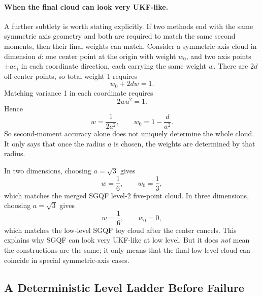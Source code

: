 \documentclass[11pt]{article}
\numberwithin{equation}{section}
\begin{document}
\paragraph{When the final cloud can look very UKF-like.}
A further subtlety is worth stating explicitly.  If two methods end with the same
symmetric axis geometry and both are required to match the same second moments,
then their final weights can match.  Consider a symmetric axis cloud in dimension
\(d\): one center point at the origin with weight \(w_0\), and two axis points
\(\pm a e_i\) in each coordinate direction, each carrying the same weight
\(w\).  There are \(2d\) off-center points, so total weight 1 requires
\begin{equation}
  w_0 + 2dw = 1.
  \label{eq:p42-axis-cloud-total-weight}
\end{equation}
Matching variance 1 in each coordinate requires
\begin{equation}
  2wa^2 = 1.
  \label{eq:p42-axis-cloud-second-moment}
\end{equation}
Hence
\begin{equation}
  w = \frac{1}{2a^2},
  \qquad
  w_0 = 1-\frac{d}{a^2}.
  \label{eq:p42-axis-cloud-weights-solved}
\end{equation}
So second-moment accuracy alone does not uniquely determine the whole cloud.  It
only says that once the radius \(a\) is chosen, the weights are determined by
that radius.

In two dimensions, choosing \(a=\sqrt3\) gives
\begin{equation}
  w = \frac16,
  \qquad
  w_0 = \frac13,
  \label{eq:p42-axis-cloud-2d-weights}
\end{equation}
which matches the merged SGQF level-2 five-point cloud.  In three dimensions,
choosing \(a=\sqrt3\) gives
\begin{equation}
  w = \frac16,
  \qquad
  w_0 = 0,
  \label{eq:p42-axis-cloud-3d-weights}
\end{equation}
which matches the low-level SGQF toy cloud after the center cancels.  This
explains why SGQF can look very UKF-like at low level.  But it does \emph{not}
mean the constructions are the same; it only means that the final low-level cloud
can coincide in special symmetric-axis cases.

\subsection{A Deterministic Level Ladder Before Failure}
\label{subsec:p32-level-ladder}
\end{document}
